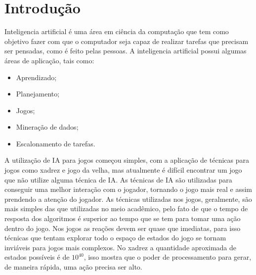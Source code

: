 \chapter{\label{chap:intro}Introdução}



Inteligencia artificial é uma área em ciência da computação que tem como objetivo fazer com que o computador seja capaz de realizar tarefas que precisam ser pensadas, como é feito pelas pessoas.  
A inteligencia artificial possui algumas áreas de aplicação, tais como: %
\begin{itemize}
	\item Aprendizado;
	\item Planejamento;
	\item Jogos;
	\item Mineração de dados;
	\item Escalonamento de tarefas.
\end{itemize}


A utilização de IA para jogos começou simples, com a aplicação de técnicas para jogos como xadrez e jogo da velha, mas atualmente é difícil encontrar um jogo que não utilize alguma técnica de IA. As técnicas de IA são utilizadas para conseguir uma melhor interação com o jogador, tornando o jogo mais real e assim prendendo a atenção do jogador. As técnicas utilizadas nos jogos, geralmente, são mais simples das que utilizadas no meio acadêmico, pelo fato de que o tempo de resposta dos algoritmos é superior ao tempo que se tem para tomar uma ação dentro do jogo. Nos jogos as reações devem ser quase que imediatas, para isso técnicas que tentam explorar todo o espaço de estados do jogo se tornam inviáveis para jogos mais complexos. No xadrez a quantidade aproximada de estados possíveis é de $10^{40}$, isso mostra que o poder de processamento para gerar, de maneira rápida, uma ação precisa ser alto. \\


